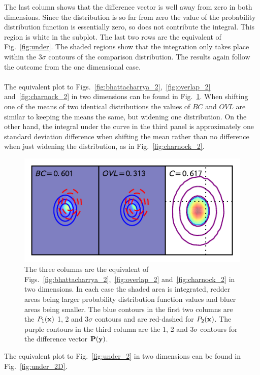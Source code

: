 \documentclass[twocolumn]{revtex4-1}
\begin{document}
    The last column shows that the difference vector is well away from zero in both dimensions.
    Since the distribution is so far from zero the value of the probability distribution function is essentially zero, so does not contribute the integral.
    This region is white in the subplot.
    The last two rows are the equivalent of Fig.~\ref{fig:under}.
    The shaded regions show that the integration only takes place within the 3$\sigma$ contours of the comparison distribution.
    The results again follow the outcome from the one dimensional case.
    \\
    \\ 
    The equivalent plot to Figs.~\ref{fig:bhattacharrya_2},~\ref{fig:overlap_2} and~\ref{fig:charnock_2} in two dimensions can be found in Fig.~\ref{fig:2D_2}.
    When shifting one of the means of two identical distributions the values of $BC$ and $OVL$ are similar to keeping the means the same, but widening one distribution.
    On the other hand, the integral under the curve in the third panel is approximately one standard deviation difference when shifting the mean rather than no difference when just widening the distribution, as in Fig.~\ref{fig:charnock_2}.
    \begin{figure}
        \centering
        \includegraphics{../comparison/plots/2D_2.pdf}
        \caption{The three columns are the equivalent of Figs.~\ref{fig:bhattacharrya_2},~\ref{fig:overlap_2} and~\ref{fig:charnock_2} in two dimensions.
                 In each case the shaded area is integrated, redder areas being larger probability distribution function values and bluer areas being smaller.
                 The blue contours in the first two columns are the $P_1({\bf x})$ 1, 2 and 3$\sigma$ contours and are red-dashed for $P_2({\bf x})$.
                 The purple contours in the third column are the 1, 2 and 3$\sigma$ contours for the difference vector ${\bf P}({\bf y})$.}
        \label{fig:2D_2}
    \end{figure} 
    \noindent The equivalent plot to Fig.~\ref{fig:under_2} in two dimensions can be found in Fig.~\ref{fig:under_2D}.
\end{document}

